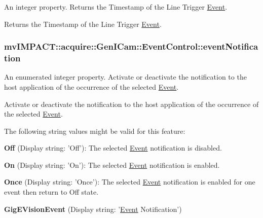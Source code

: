 An integer property. Returns the Timestamp of the Line Trigger \hyperlink{classmv_i_m_p_a_c_t_1_1acquire_1_1_event}{Event}. 

Returns the Timestamp of the Line Trigger \hyperlink{classmv_i_m_p_a_c_t_1_1acquire_1_1_event}{Event}. \hypertarget{classmv_i_m_p_a_c_t_1_1acquire_1_1_gen_i_cam_1_1_event_control_aba510fcef5cb7a59847557a472452ca1}{
\subsubsection[{event\+Notification}]{ mv\+I\+M\+P\+A\+C\+T\+::acquire\+::\+Gen\+I\+Cam\+::\+Event\+Control\+::event\+Notification}}\label{classmv_i_m_p_a_c_t_1_1acquire_1_1_gen_i_cam_1_1_event_control_aba510fcef5cb7a59847557a472452ca1}


An enumerated integer property. Activate or deactivate the notification to the host application of the occurrence of the selected \hyperlink{classmv_i_m_p_a_c_t_1_1acquire_1_1_event}{Event}. 

Activate or deactivate the notification to the host application of the occurrence of the selected \hyperlink{classmv_i_m_p_a_c_t_1_1acquire_1_1_event}{Event}.

The following string values might be valid for this feature\+:
\begin{DoxyItemize}
\item {\bfseries Off} (Display string\+: 'Off')\+: The selected \hyperlink{classmv_i_m_p_a_c_t_1_1acquire_1_1_event}{Event} notification is disabled.
\item {\bfseries On} (Display string\+: 'On')\+: The selected \hyperlink{classmv_i_m_p_a_c_t_1_1acquire_1_1_event}{Event} notification is enabled.
\item {\bfseries Once} (Display string\+: 'Once')\+: The selected \hyperlink{classmv_i_m_p_a_c_t_1_1acquire_1_1_event}{Event} notification is enabled for one event then return to Off state.
\item {\bfseries Gig\+E\+Vision\+Event} (Display string\+: '\hyperlink{classmv_i_m_p_a_c_t_1_1acquire_1_1_event}{Event} Notification')
\end{DoxyItemize}

